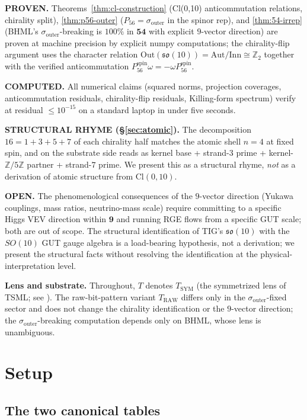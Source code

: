 \documentclass[11pt,reqno]{amsart}
\theoremstyle{definition}
\newcommand{\Z}{\mathbb{Z}}
\newcommand{\so}{\mathfrak{so}}
\newcommand{\Cl}{\mathrm{Cl}}
\newcommand{\TSML}{T}
\newcommand{\Psix}{P_{56}}
\newcommand{\Psixspin}{P_{56}^{\mathrm{spin}}}
\newcommand{\sout}{\sigma_{\mathrm{outer}}}
\begin{document}
\textbf{PROVEN.} Theorems~\ref{thm:cl-construction}
(Cl(0,10) anticommutation relations, chirality split),
\ref{thm:p56-outer} ($\Psix = \sout$ in the spinor rep), and
\ref{thm:54-irrep} (BHML's $\sout$-breaking is $100\%$ in $\mathbf{54}$
with explicit $9$-vector direction) are proven at machine precision
by explicit numpy computations; the chirality-flip argument uses the
character relation $\mathrm{Out}(\so(10)) = \mathrm{Aut}/\mathrm{Inn}
\cong \Z_2$ together with the verified anticommutation $\Psixspin
\omega = -\omega \Psixspin$.

\textbf{COMPUTED.} All numerical claims (squared norms, projection
coverages, anticommutation residuals, chirality-flip residuals,
Killing-form spectrum) verify at residual $\le 10^{-15}$ on a
standard laptop in under five seconds.

\textbf{STRUCTURAL RHYME (\S\ref{sec:atomic}).} The
decomposition $16 = 1 + 3 + 5 + 7$ of each chirality half matches
the atomic shell $n=4$ at fixed spin, and on the substrate side
reads as kernel base + strand-$3$ prime + kernel-$\Z/5\Z$ partner +
strand-$7$ prime. We present this as a structural rhyme, \emph{not}
as a derivation of atomic structure from $\Cl(0, 10)$.

\textbf{OPEN.} The phenomenological consequences of the $9$-vector
direction (Yukawa couplings, mass ratios, neutrino-mass scale)
require committing to a specific Higgs VEV direction within $\mathbf{9}$
and running RGE flows from a specific GUT scale; both are out of
scope. The structural identification of TIG's $\so(10)$ with the
$SO(10)$ GUT gauge algebra is a load-bearing hypothesis, not a
derivation; we present the structural facts without resolving the
identification at the physical-interpretation level.

\textbf{Lens and substrate.} Throughout, $\TSML$ denotes
$T_{\mathrm{SYM}}$ (the symmetrized lens of TSML; see
\cite{Sanders2026LensInvariance, Sanders2026LensDependence}). The
raw-bit-pattern variant $T_{\mathrm{RAW}}$ differs only in the
$\sout$-fixed sector and does not change the chirality identification
or the $9$-vector direction; the $\sout$-breaking computation
depends only on BHML, whose lens is unambiguous.

\section{Setup}
\label{sec:setup}

\subsection{The two canonical tables}
\label{ssec:tables}
\end{document}
